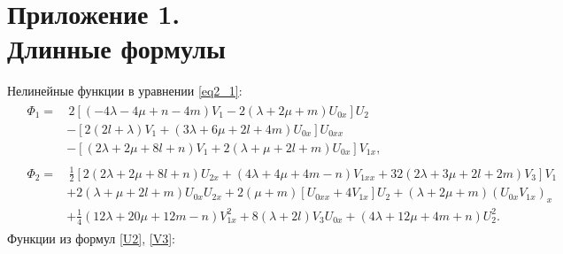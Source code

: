 \documentclass[12pt, a4paper]{report}
\begin{document}
\chapter*{\vspace{-25mm}Приложение 1. \\Длинные формулы}
\vspace{-5mm}
Нелинейные функции в уравнении \eqref{eq2_1}:
\begin{equation} \nonumber
\begin{split}
&\begin{split}
\Phi_1 =& \, 2\left[(-4\lambda - 4\mu + n - 4m) V_1 - 2(\lambda + 2\mu + m) U_{0x}\right] U_2 \\
&- \left[ 2(2l + \lambda) V_1 + (3\lambda + 6\mu + 2l + 4m) U_{0x} \right] U_{0xx} \\
& - \left[ (2\lambda + 2\mu + 8l + n) V_1 + 2(\lambda + \mu + 2l + m) U_{0x} \right] V_{1x},
\end{split} \\
&\begin{split}
\Phi_2 =& \, \frac12 \left[2 (2\lambda + 2\mu + 8l + n) U_{2x} + (4\lambda + 4\mu + 4m - n) V_{1xx} + 32(2\lambda + 3\mu + 2l + 2m) V_3 \right] V_1 \\
& + 2(\lambda + \mu + 2l + m) U_{0x} U_{2x} + 2(\mu + m)\left[ U_{0xx} + 4 V_{1x} \right] U_2 + (\lambda + 2\mu + m)(U_{0x} V_{1x})_x\\
& + \frac14(12\lambda + 20\mu + 12m - n) V_{1x}^2 + 8(\lambda + 2l) V_3 U_{0x} + (4\lambda + 12\mu + 4m + n) U_2^2.
\end{split}
\end{split}
\end{equation}
Функции из формул \eqref{U2}, \eqref{V3}:
\end{document}
